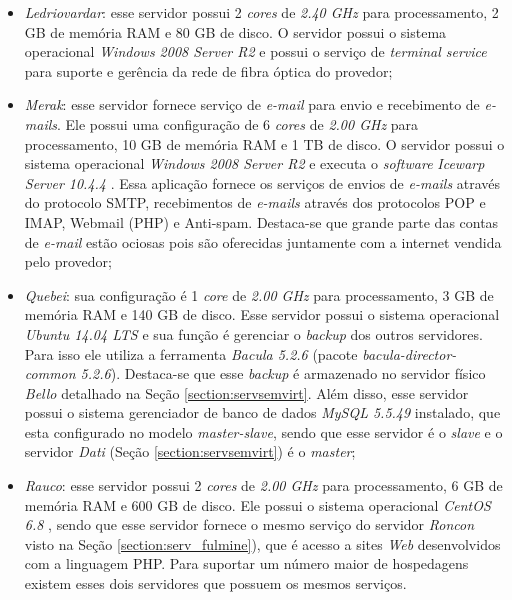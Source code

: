 \begin{itemize}
 \item \textit{Ledriovardar}: esse servidor possui 2 \textit{cores} de \textit{2.40 GHz} para processamento, 2 GB de memória RAM e 80 GB de disco. 
 O servidor possui o sistema operacional \textit{Windows 2008 Server R2} e possui o serviço de \textit{terminal service} para suporte e gerência 
 da rede de fibra óptica do provedor;
 
 \item \textit{Merak}: esse servidor fornece serviço de \textit{e-mail} para envio e recebimento de \textit{e-mails}. Ele possui uma configuração 
 de 6 \textit{cores} de \textit{2.00 GHz} para processamento, 10 GB de memória RAM e 1 TB de disco. O servidor possui o sistema operacional 
 \textit{Windows 2008 Server R2} e executa o \textit{software} \textit{Icewarp Server 10.4.4} \cite{icewarp}. Essa aplicação fornece os serviços 
 de envios de \textit{e-mails} através do protocolo \ac{SMTP}, recebimentos de \textit{e-mails} através dos protocolos \ac{POP} e \ac{IMAP}, 
 Webmail (\ac{PHP}) e Anti-spam. Destaca-se que grande parte das contas de \textit{e-mail} estão ociosas pois são oferecidas juntamente com a 
 internet vendida pelo provedor;
 
 \item \textit{Quebei}: sua configuração é 1 \textit{core} de \textit{2.00 GHz} para processamento, 3 GB de memória RAM e 140 GB de disco. 
 Esse servidor possui o sistema operacional \textit{Ubuntu 14.04 \ac{LTS}} \cite{ubuntu} e sua função é gerenciar o \textit{backup} dos outros 
 servidores. Para isso ele utiliza a ferramenta \textit{Bacula 5.2.6} \cite{bacula} (pacote \textit{bacula-director-common 5.2.6}). Destaca-se
 que esse \textit{backup} é armazenado no servidor físico \textit{Bello} detalhado na Seção \ref{section:servsemvirt}. Além disso, 
 esse servidor possui o sistema gerenciador de banco de dados \textit{MySQL 5.5.49} \cite{mysql} instalado, que esta configurado no modelo 
 \textit{master-slave}, sendo que esse servidor é o \textit{slave} e o servidor \textit{Dati} (Seção \ref{section:servsemvirt}) é o \textit{master};
 
 \item \textit{Rauco}: esse servidor possui 2 \textit{cores} de \textit{2.00 GHz} para processamento, 6 GB de memória RAM e 600 GB de disco. 
 Ele possui o sistema operacional \textit{CentOS 6.8} \cite{centos}, sendo que esse servidor fornece o mesmo serviço do servidor \textit{Roncon} 
 visto na Seção \ref{section:serv_fulmine}), que é acesso a sites \textit{Web} desenvolvidos com a linguagem \ac{PHP}. Para suportar um número 
 maior de hospedagens existem esses dois servidores que possuem os mesmos serviços.
\end{itemize}

